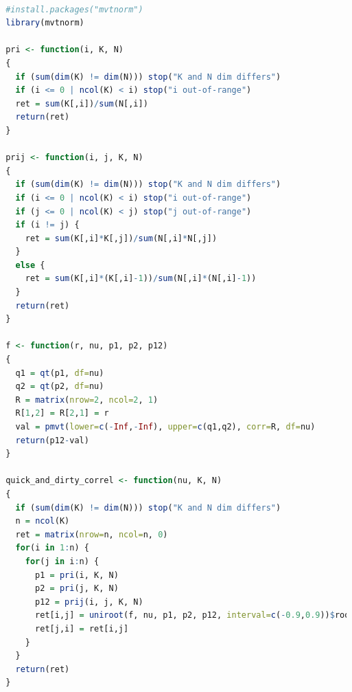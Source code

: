 \documentclass[11pt,fleqn]{book} %
\begin{document}
\begin{lstlisting}[language=R, label=sc:qadc, caption=Quick-and-dirty correlation (R script)]

 #install.packages("mvtnorm")
 library(mvtnorm)

 pri <- function(i, K, N)
 {
   if (sum(dim(K) != dim(N))) stop("K and N dim differs")
   if (i <= 0 | ncol(K) < i) stop("i out-of-range")
   ret = sum(K[,i])/sum(N[,i])
   return(ret)
 }

 prij <- function(i, j, K, N)
 {
   if (sum(dim(K) != dim(N))) stop("K and N dim differs")
   if (i <= 0 | ncol(K) < i) stop("i out-of-range")
   if (j <= 0 | ncol(K) < j) stop("j out-of-range")
   if (i != j) {
     ret = sum(K[,i]*K[,j])/sum(N[,i]*N[,j])
   }
   else {
     ret = sum(K[,i]*(K[,i]-1))/sum(N[,i]*(N[,i]-1))
   }
   return(ret)
 }

 f <- function(r, nu, p1, p2, p12)
 {
   q1 = qt(p1, df=nu)
   q2 = qt(p2, df=nu)
   R = matrix(nrow=2, ncol=2, 1)
   R[1,2] = R[2,1] = r
   val = pmvt(lower=c(-Inf,-Inf), upper=c(q1,q2), corr=R, df=nu)
   return(p12-val)
 }

 quick_and_dirty_correl <- function(nu, K, N)
 {
   if (sum(dim(K) != dim(N))) stop("K and N dim differs")
   n = ncol(K)
   ret = matrix(nrow=n, ncol=n, 0)
   for(i in 1:n) {
     for(j in i:n) {
       p1 = pri(i, K, N)
       p2 = pri(j, K, N)
       p12 = prij(i, j, K, N)
       ret[i,j] = uniroot(f, nu, p1, p2, p12, interval=c(-0.9,0.9))$root
       ret[j,i] = ret[i,j]
     }
   }
   return(ret)
 }

\end{lstlisting}
\end{document}
